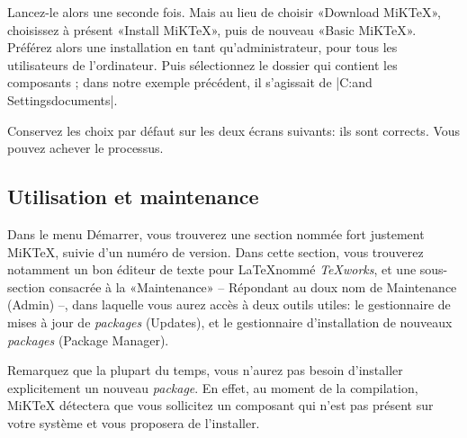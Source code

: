 Lancez-le alors une seconde fois. Mais au lieu de choisir «Download MiKTeX», choisissez à présent «Install MiKTeX», puis de nouveau «Basic MiKTeX». Préférez alors une installation en tant qu'administrateur, pour tous les utilisateurs de l'ordinateur. Puis sélectionnez le dossier qui contient les composants ; dans notre exemple précédent, il s'agissait de \verbe|C:\Documents and Settings\Votreutilisateur\Mes documents\miktex|.

Conservez les choix par défaut sur les deux écrans suivants: ils sont corrects. Vous pouvez achever le processus.


\subsection{Utilisation et maintenance}

Dans le menu Démarrer, vous trouverez une section nommée fort justement MiKTeX, suivie d'un numéro de version. Dans cette section, vous trouverez notamment un bon éditeur de texte  pour \LaTeX nommé \emph{TeXworks}, et une sous-section consacrée à la «Maintenance» – Répondant au doux nom de Maintenance (Admin) –, dans laquelle vous aurez accès à deux outils utiles: le gestionnaire de mises à jour de \emph{packages} (Updates), et le gestionnaire d'installation de nouveaux \emph{packages} (Package Manager).

Remarquez que la plupart du temps, vous n'aurez pas besoin d'installer explicitement un nouveau \emph{package}. En effet, au moment de la compilation, MiKTeX détectera que vous sollicitez un composant qui n'est pas présent sur votre système et vous proposera de l'installer.

